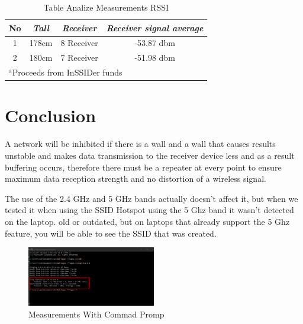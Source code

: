 \documentclass[conference]{IEEEtran}
\begin{document}
\begin{table}[htbp]
    \caption{Table Analize Measurements RSSI}
    \begin{center}
    \begin{tabular}{|c|c|c|c|}
        \hline
    \textbf{No} & \textbf{\textit{Tall}}& \textbf{\textit{Receiver}}& \textbf{\textit{Receiver signal average}} \\
    \hline
    1 & 178cm& 8 Receiver & -53.87 dbm  \\
    \hline
    2 & 180cm& 7 Receiver & -51.98 dbm  \\
    \hline
    \multicolumn{4}{l}{$^{\mathrm{a}}$Proceeds from InSSIDer funds}
    \end{tabular}
    \label{tab2}
    \end{center}
    \end{table}

\section{Conclusion}

A network will be inhibited if there is a wall and a wall that causes results
unstable and makes data transmission to the receiver device less and as a result buffering occurs, therefore there must be a repeater at every point
to ensure maximum data reception strength and no distortion of a wireless signal.

The use of the 2.4 GHz and 5 GHz bands actually doesn't affect it, but when we tested it when using the SSID Hotspot using the 5 Ghz band it wasn't detected on the laptop.
old or outdated, but on laptops that already support the 5 Ghz feature, you will be able to see the SSID that was created. ~\cite{weaver2013guide}

\begin{figure}[h]
    \centering
    \includegraphics[width=0.5\textwidth]{ping.png}
    \caption{Measurements With Commad Promp}
\end{figure}



\end{document}
